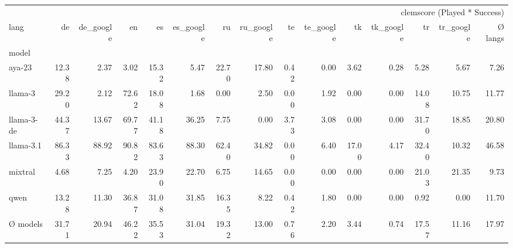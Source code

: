 \begin{tabular}{lrrrrrrrrrrrrrr}
\toprule
 & \multicolumn{14}{r}{clemscore (Played * Success)} \\
lang & de & de_google & en & es & es_google & ru & ru_google & te & te_google & tk & tk_google & tr & tr_google & Ø langs \\
model &  &  &  &  &  &  &  &  &  &  &  &  &  &  \\
\midrule
aya-23 & 12.38 & 2.37 & 3.02 & 15.32 & 5.47 & 22.70 & 17.80 & 0.42 & 0.00 & 3.62 & 0.28 & 5.28 & 5.67 & 7.26 \\
llama-3 & 29.20 & 2.12 & 72.62 & 18.08 & 1.68 & 0.00 & 2.50 & 0.00 & 1.92 & 0.00 & 0.00 & 14.08 & 10.75 & 11.77 \\
llama-3-de & 44.37 & 13.67 & 69.77 & 41.18 & 36.25 & 7.75 & 0.00 & 3.73 & 3.08 & 0.00 & 0.00 & 31.70 & 18.85 & 20.80 \\
llama-3.1 & 86.33 & 88.92 & 90.82 & 83.63 & 88.30 & 62.40 & 34.82 & 0.00 & 6.40 & 17.00 & 4.17 & 32.40 & 10.32 & 46.58 \\
mixtral & 4.68 & 7.25 & 4.20 & 23.90 & 22.70 & 6.75 & 14.65 & 0.00 & 0.00 & 0.00 & 0.00 & 21.03 & 21.35 & 9.73 \\
qwen & 13.28 & 11.30 & 36.87 & 31.08 & 31.85 & 16.35 & 8.22 & 0.42 & 1.80 & 0.00 & 0.00 & 0.92 & 0.00 & 11.70 \\
Ø models & 31.71 & 20.94 & 46.22 & 35.53 & 31.04 & 19.32 & 13.00 & 0.76 & 2.20 & 3.44 & 0.74 & 17.57 & 11.16 & 17.97 \\
\bottomrule
\end{tabular}
